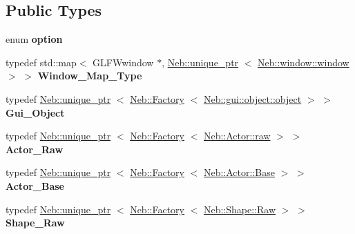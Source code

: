 \subsection*{\-Public \-Types}
\begin{DoxyCompactItemize}
\item 
enum {\bfseries option} 
\item 
\hypertarget{classNeb_1_1master_aeb2db0ac51b05f774e11aa19b9d2ce86}{typedef std\-::map$<$ \-G\-L\-F\-Wwindow \*
$\ast$, \hyperlink{classNeb_1_1unique__ptr}{\-Neb\-::unique\-\_\-ptr}\*
$<$ \hyperlink{classNeb_1_1window_1_1window}{\-Neb\-::window\-::window} $>$ $>$ {\bfseries \-Window\-\_\-\-Map\-\_\-\-Type}}\label{classNeb_1_1master_aeb2db0ac51b05f774e11aa19b9d2ce86}

\item 
\hypertarget{classNeb_1_1master_a1a959eb16f64013e430871c9b8069822}{typedef \hyperlink{classNeb_1_1unique__ptr}{\-Neb\-::unique\-\_\-ptr}\*
$<$ \hyperlink{classNeb_1_1Factory}{\-Neb\-::\-Factory}\*
$<$ \hyperlink{classNeb_1_1gui_1_1object_1_1object}{\-Neb\-::gui\-::object\-::object} $>$ $>$ {\bfseries \-Gui\-\_\-\-Object}}\label{classNeb_1_1master_a1a959eb16f64013e430871c9b8069822}

\item 
\hypertarget{classNeb_1_1master_ac3af757b70b0e360f6edf70403b822c7}{typedef \hyperlink{classNeb_1_1unique__ptr}{\-Neb\-::unique\-\_\-ptr}\*
$<$ \hyperlink{classNeb_1_1Factory}{\-Neb\-::\-Factory}\*
$<$ \hyperlink{classNeb_1_1Actor_1_1raw}{\-Neb\-::\-Actor\-::raw} $>$ $>$ {\bfseries \-Actor\-\_\-\-Raw}}\label{classNeb_1_1master_ac3af757b70b0e360f6edf70403b822c7}

\item 
\hypertarget{classNeb_1_1master_a8dcf02efec834efa24ebb04186809923}{typedef \hyperlink{classNeb_1_1unique__ptr}{\-Neb\-::unique\-\_\-ptr}\*
$<$ \hyperlink{classNeb_1_1Factory}{\-Neb\-::\-Factory}\*
$<$ \hyperlink{classNeb_1_1Actor_1_1Base}{\-Neb\-::\-Actor\-::\-Base} $>$ $>$ {\bfseries \-Actor\-\_\-\-Base}}\label{classNeb_1_1master_a8dcf02efec834efa24ebb04186809923}

\item 
\hypertarget{classNeb_1_1master_a8d33f192971df2a7a14f40ae78868059}{typedef \hyperlink{classNeb_1_1unique__ptr}{\-Neb\-::unique\-\_\-ptr}\*
$<$ \hyperlink{classNeb_1_1Factory}{\-Neb\-::\-Factory}\*
$<$ \hyperlink{classNeb_1_1Shape_1_1Raw}{\-Neb\-::\-Shape\-::\-Raw} $>$ $>$ {\bfseries \-Shape\-\_\-\-Raw}}\label{classNeb_1_1master_a8d33f192971df2a7a14f40ae78868059}


\end{DoxyCompactItemize}
